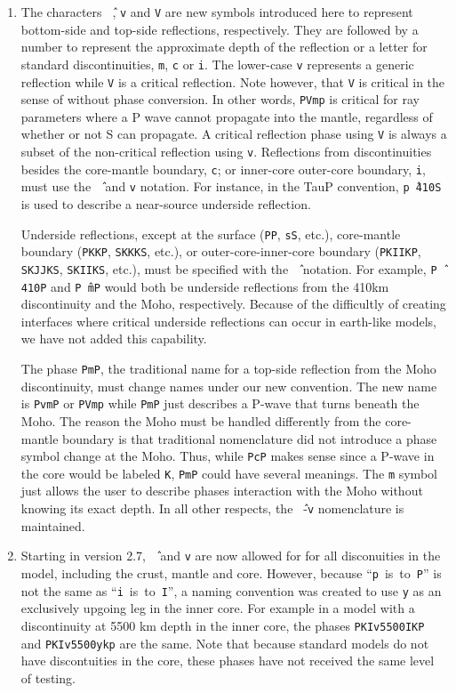 \begin{enumerate}
\item \label{carrotv}
The characters \texttt{\^\,}, \texttt{v} and \texttt{V} are new symbols introduced here to
represent bottom-side and top-side reflections, respectively.
They are followed by a number to
represent the approximate depth of the reflection or
a letter for standard discontinuities, \texttt{m}, \texttt{c} or \texttt{i}.
The lower-case \texttt{v} represents a generic reflection while \texttt{V} is
a critical reflection. Note however, that  \texttt{V} is critical in the sense of
without phase conversion. In other words, \texttt{PVmp} is critical for ray parameters
where a P wave cannot propagate into the mantle, regardless of whether
or not S can propagate. A critical reflection phase using \texttt{V} is always
a subset of the non-critical reflection using \texttt{v}.
Reflections from discontinuities besides the
core-mantle boundary, \texttt{c};
or inner-core outer-core boundary, \texttt{i}, must use the \texttt{\^\,}
and \texttt{v} notation.
For instance, in the TauP convention, \texttt{p\^\,410S} is used to describe
a near-source underside reflection.

Underside reflections, except at the
surface (\texttt{PP}, \texttt{sS}, etc.),
core-mantle boundary (\texttt{PKKP}, \texttt{SKKKS}, etc.), or
outer-core-inner-core boundary (\texttt{PKIIKP}, \texttt{SKJJKS},
\texttt{SKIIKS}, etc.), must
be specified with the \texttt{\^\,} notation.
For example, \texttt{P\^\,410P} and
\texttt{P\^\,mP} would both be underside
reflections from the 410km discontinuity and the Moho, respectively.
Because of the difficultly of creating interfaces where critical underside reflections
can occur in earth-like models, we have not added this capability.

The phase \texttt{PmP}, the traditional name for a top-side reflection from the Moho
discontinuity, must change names under our new convention.
The new name is \texttt{PvmP} or \texttt{PVmp}
while \texttt{PmP} just describes a P-wave that turns beneath the Moho.
The reason the Moho must be handled differently from the core-mantle boundary is that
traditional nomenclature did not introduce a phase symbol change at the Moho.
Thus, while \texttt{PcP} makes sense since a P-wave in the core would be labeled
\texttt{K}, \texttt{PmP} could have several meanings.
The \texttt{m} symbol just allows the user to describe phases interaction with the Moho
without knowing its exact depth.
In all other respects, the \texttt{\^\,}-\texttt{v} nomenclature is maintained.

\item
Starting in version 2.7, \texttt{\^\,} and \texttt{v} are now allowed
for for all disconuities in the model, including
the crust, mantle and core.
However, because
``\texttt{p}~is~to~\texttt{P}'' is not the same as
``\texttt{i}~is~to~\texttt{I}'',
a naming convention was created to use \texttt{y} as an exclusively
upgoing leg in the inner core. For example in a model with a discontinuity at 5500 km depth in the inner core, the phases
\texttt{PKIv5500IKP} and \texttt{PKIv5500ykp} are the same. Note that
because standard models do not have discontuities in the core, these
phases have not received the same level of testing.


\end{enumerate}
